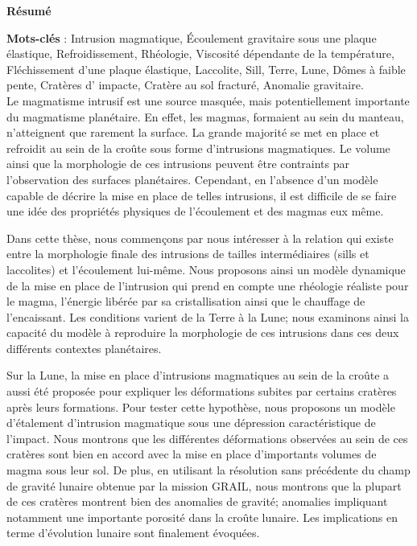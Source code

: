 \thispagestyle{fancy}
\begin{center}
 \Large
 \textbf{Résumé}
\end{center}

\textbf{Mots-clés} : Intrusion magmatique, Écoulement gravitaire sous
une plaque élastique, Refroidissement, Rhéologie, Viscosité dépendante
de la température, Fléchissement d'une plaque élastique, Laccolite,
Sill, Terre, Lune, Dômes à faible pente, Cratères d' impacte, Cratère
au sol fracturé, Anomalie gravitaire.\\

Le magmatisme intrusif est une source masquée, mais potentiellement
importante du magmatisme planétaire. En effet, les magmas, formaient au
sein du manteau, n'atteignent que rarement la surface. La grande
majorité se met en place et refroidit au sein de la croûte sous forme
d'intrusions magmatiques. Le volume ainsi que la morphologie de ces
intrusions peuvent être contraints par l’observation des surfaces
planétaires. Cependant, en l'absence d'un modèle capable de décrire la
mise en place de telles intrusions, il est difficile de se faire une
idée des propriétés physiques de l'écoulement et des magmas eux même.

Dans cette thèse, nous commençons par nous intéresser à la relation
qui existe entre la morphologie finale des intrusions de tailles
intermédiaires (sills et laccolites) et l'écoulement lui-même. Nous
proposons ainsi un modèle dynamique de la mise en place de l’intrusion
qui prend en compte une rhéologie réaliste pour le magma, l'énergie
libérée par sa cristallisation ainsi que le chauffage de l'encaissant.
Les conditions varient de la Terre à la Lune; nous examinons ainsi la
capacité du modèle à reproduire la morphologie de ces intrusions dans
ces deux différents contextes planétaires.

Sur la Lune,  la mise en place d'intrusions magmatiques  au sein de la
croûte a  aussi été proposée  pour expliquer les  déformations subites
par  certains  cratères  après  leurs formations.  Pour  tester  cette
hypothèse, nous proposons un modèle d'étalement d'intrusion magmatique
sous une dépression caractéristique de l'impact. Nous montrons que les
différentes déformations observées  au sein de ces  cratères sont bien
en accord  avec la mise  en place  d'importants volumes de  magma sous
leur sol. De plus, en utilisant la résolution sans précédente du champ
de gravité lunaire obtenue par la  mission GRAIL, nous montrons que la
plupart  de  ces cratères  montrent  bien  des anomalies  de  gravité;
anomalies impliquant notamment une  importante porosité dans la croûte
lunaire. Les implications en terme d'évolution lunaire sont finalement
évoquées.

